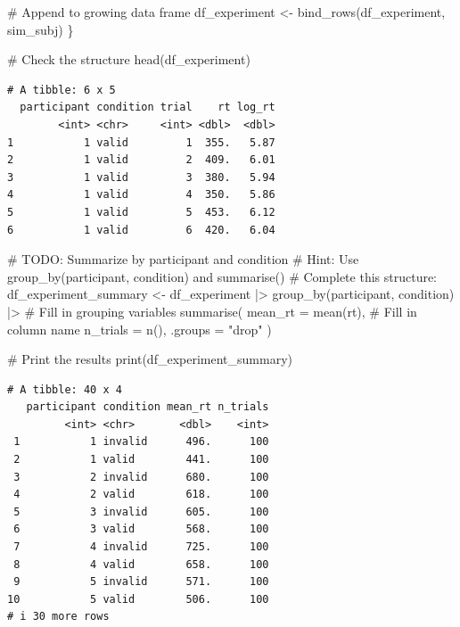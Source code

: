 \documentclass[
  letterpaper,
  DIV=11,
  numbers=noendperiod]{scrartcl}
\newenvironment{Shaded}{\begin{snugshade}}{\end{snugshade}}
\newcommand{\AlertTok}[1]{\textcolor[rgb]{0.68,0.00,0.00}{#1}}
\newcommand{\AttributeTok}[1]{\textcolor[rgb]{0.40,0.45,0.13}{#1}}
\newcommand{\CommentTok}[1]{\textcolor[rgb]{0.37,0.37,0.37}{#1}}
\newcommand{\FunctionTok}[1]{\textcolor[rgb]{0.28,0.35,0.67}{#1}}
\newcommand{\NormalTok}[1]{\textcolor[rgb]{0.00,0.23,0.31}{#1}}
\newcommand{\OtherTok}[1]{\textcolor[rgb]{0.00,0.23,0.31}{#1}}
\newcommand{\SpecialCharTok}[1]{\textcolor[rgb]{0.37,0.37,0.37}{#1}}
\newcommand{\StringTok}[1]{\textcolor[rgb]{0.13,0.47,0.30}{#1}}
\begin{document}
\begin{Shaded}
\begin{Highlighting}[]
  \CommentTok{\# Append to growing data frame}
\NormalTok{  df\_experiment }\OtherTok{\textless{}{-}} \FunctionTok{bind\_rows}\NormalTok{(df\_experiment, sim\_subj)}
\NormalTok{\}}

\CommentTok{\# Check the structure}
\FunctionTok{head}\NormalTok{(df\_experiment)}
\end{Highlighting}
\end{Shaded}

\begin{verbatim}
# A tibble: 6 x 5
  participant condition trial    rt log_rt
        <int> <chr>     <int> <dbl>  <dbl>
1           1 valid         1  355.   5.87
2           1 valid         2  409.   6.01
3           1 valid         3  380.   5.94
4           1 valid         4  350.   5.86
5           1 valid         5  453.   6.12
6           1 valid         6  420.   6.04
\end{verbatim}

\begin{Shaded}
\begin{Highlighting}[]
\CommentTok{\# }\AlertTok{TODO}\CommentTok{: Summarize by participant and condition}
\CommentTok{\# Hint: Use group\_by(participant, condition) and summarise()}
\CommentTok{\# Complete this structure:}
\NormalTok{df\_experiment\_summary }\OtherTok{\textless{}{-}}\NormalTok{ df\_experiment }\SpecialCharTok{|\textgreater{}}
  \FunctionTok{group\_by}\NormalTok{(participant, condition) }\SpecialCharTok{|\textgreater{}}  \CommentTok{\# Fill in grouping variables}
  \FunctionTok{summarise}\NormalTok{(}
    \AttributeTok{mean\_rt =} \FunctionTok{mean}\NormalTok{(rt),  }\CommentTok{\# Fill in column name}
    \AttributeTok{n\_trials =} \FunctionTok{n}\NormalTok{(),}
    \AttributeTok{.groups =} \StringTok{"drop"}
\NormalTok{  )}

\CommentTok{\# Print the results}
\FunctionTok{print}\NormalTok{(df\_experiment\_summary)}
\end{Highlighting}
\end{Shaded}

\begin{verbatim}
# A tibble: 40 x 4
   participant condition mean_rt n_trials
         <int> <chr>       <dbl>    <int>
 1           1 invalid      496.      100
 2           1 valid        441.      100
 3           2 invalid      680.      100
 4           2 valid        618.      100
 5           3 invalid      605.      100
 6           3 valid        568.      100
 7           4 invalid      725.      100
 8           4 valid        658.      100
 9           5 invalid      571.      100
10           5 valid        506.      100
# i 30 more rows
\end{verbatim}
\end{document}
